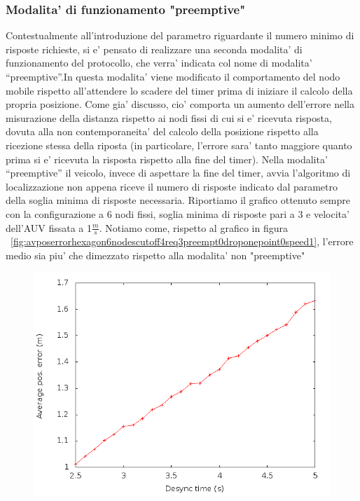 \subsubsection{Modalita' di funzionamento "preemptive"}
Contestualmente all'introduzione del parametro riguardante il numero minimo di risposte richieste, si e' pensato di realizzare una seconda modalita' di funzionamento del protocollo, che verra' indicata col nome di modalita'  ``preemptive''.\newline In questa modalita' viene modificato il  comportamento del nodo mobile rispetto all'attendere lo scadere del timer prima di iniziare il calcolo della propria posizione. Come gia' discusso, cio' comporta un aumento dell'errore nella misurazione della distanza rispetto ai nodi fissi di cui si e' ricevuta risposta, dovuta alla non contemporaneita' del calcolo della posizione rispetto alla ricezione stessa della riposta (in particolare, l'errore sara' tanto maggiore quanto prima si e' ricevuta la risposta rispetto alla fine del timer).\newline
Nella modalita' ``preemptive'' il veicolo, invece di aspettare la fine del timer,  avvia l'algoritmo di localizzazione non appena riceve il numero di risposte indicato dal parametro della soglia minima di risposte necessaria.
Riportiamo il grafico ottenuto sempre con la configurazione a 6 nodi fissi, soglia minima di risposte pari a 3 e velocita' dell'AUV fissata a 1$\frac{m}{s}$. Notiamo come, rispetto al grafico in figura ~\ref{fig:avposerrorhexagon6nodescutoff4req3preempt0droponepoint0speed1}, l'errore medio sia piu' che dimezzato rispetto alla modalita' non "preemptive"
\begin{figure}[H]
    \includegraphics[scale=0.5]{avposerrorhexagon6nodescutoff4req3preempt1droponepoint0speed1.png}
    \centering
\end{figure}

